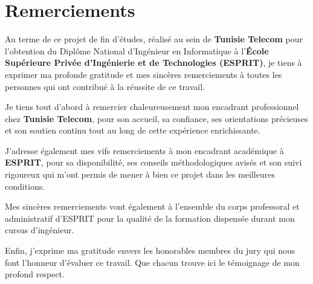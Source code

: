 \chapter*{Remerciements}

Au terme de ce projet de fin d'études, réalisé au sein de \textbf{Tunisie Telecom} pour l'obtention du Diplôme National d'Ingénieur en Informatique à l'\textbf{École Supérieure Privée d'Ingénierie et de Technologies (ESPRIT)}, je tiens à exprimer ma profonde gratitude et mes sincères remerciements à toutes les personnes qui ont contribué à la réussite de ce travail.

Je tiens tout d'abord à remercier chaleureusement mon encadrant professionnel chez \textbf{Tunisie Telecom}, pour son accueil, sa confiance, ses orientations précieuses et son soutien continu tout au long de cette expérience enrichissante.

J'adresse également mes vifs remerciements à mon encadrant académique à \textbf{ESPRIT}, pour sa disponibilité, ses conseils méthodologiques avisés et son suivi rigoureux qui m'ont permis de mener à bien ce projet dans les meilleures conditions.

Mes sincères remerciements vont également à l'ensemble du corps professoral et administratif d'ESPRIT pour la qualité de la formation dispensée durant mon cursus d'ingénieur.

Enfin, j'exprime ma gratitude envers les honorables membres du jury qui nous font l'honneur d'évaluer ce travail. Que chacun trouve ici le témoignage de mon profond respect.
